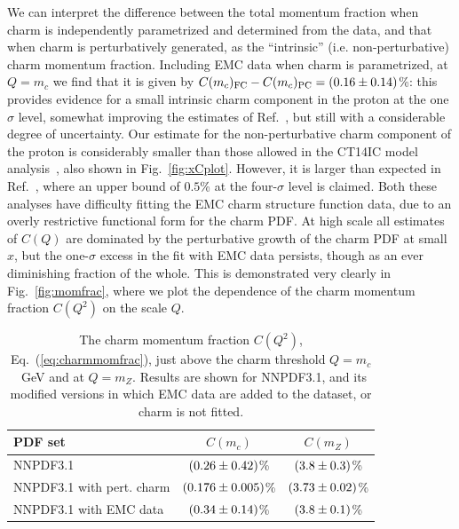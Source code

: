 We can interpret the  difference between the total momentum fraction
when charm is independently parametrized and determined from the data, 
and that when charm is perturbatively generated, as the
``intrinsic'' (i.e. non-perturbative) charm momentum fraction.
Including EMC data when charm is parametrized,
at  $Q=m_c$  we find that it is given by
$C(m_c)_{\rm FC}-C(m_c)_{\rm PC} =  \left(0.16 \pm 0.14\right)$\%: this provides evidence
for a small intrinsic charm component in the proton at the
one $\sigma$ level, somewhat improving the estimates of
Ref.~\cite{Ball:2016neh}, but 
still with a considerable degree of uncertainty.
%
Our estimate for the non-perturbative charm component of the proton
is considerably smaller than those allowed in the CT14IC model analysis~\cite{Dulat:2013hea}, 
also shown in Fig.~\ref{fig:xCplot}. However, it is larger than expected 
in Ref.~\cite{Jimenez-Delgado:2014zga}, where an upper bound of $0.5$\% at the 
four-$\sigma$ level is claimed. Both these analyses have difficulty fitting the EMC charm 
structure function data, due to an overly restrictive functional form
for the charm PDF. At high scale all estimates of $C(Q)$ are dominated by the perturbative
growth of the charm PDF at small $x$, but the one-$\sigma$ excess in the fit 
with EMC data persists, though as an ever diminishing fraction of the whole. 
This is demonstrated very clearly in Fig.~\ref{fig:momfrac}, where we plot the dependence 
of the charm momentum fraction $C(Q^2)$ on the scale $Q$. 


\begin{table}[t]
  \center
   \renewcommand{\arraystretch}{1.4}
  \begin{tabular}{|l|c|c|}
    \hline
    PDF set & $C(m_c)$ & $C(m_Z)$ \\
    \hline
    \hline
    NNPDF3.1           & $\left( 0.26 \pm 0.42\right) $\%  &  $\left( 3.8 \pm 0.3\right) $\%\\
    NNPDF3.1 with pert. charm        & $\left( 0.176 \pm 0.005\right) $\%  &  $\left( 3.73 \pm 0.02\right) $\% \\
    NNPDF3.1 with EMC data  &   $\left( 0.34 \pm 0.14\right) $\% & $\left( 3.8  \pm 0.1\right) $\% \\
          \hline
  \end{tabular}
  \caption{\small \label{tab:momsr}
    The charm momentum fraction  $C(Q^2)$, Eq.~(\ref{eq:charmmomfrac}),
    just above the charm threshold $Q=m_c$~GeV and at
    $Q=m_Z$. Results are shown for NNPDF3.1, and its modified versions
    in which EMC data are added to the dataset,  or charm is not fitted. 
  }
  \end{table}

